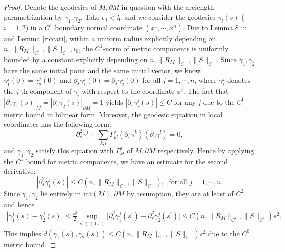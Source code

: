 \documentclass[11pt,letterpaper]{amsart}
\numberwithin{equation}{section}
\theoremstyle{definition}
\theoremstyle{plain}
\theoremstyle{definition}
\theoremstyle{plain}
\theoremstyle{definition}
\theoremstyle{plain}
\begin{document}
\begin{proof}
Denote the geodesics of $M,\partial M$ in question with the arclength parametrization by $\gamma_1,\gamma_2$. Take $\epsilon_0<i_0$ and we consider the geodesics $\gamma_i(s)$ ($i=1,2$) in a $C^1$ boundary normal coordinate $(x^1,\cdots,x^n)$. Due to Lemma 8 in \cite{HV} and Lemma \ref{riccati}, within a uniform radius explicitly depending on $n,\|R_M\|_{C^1},\|S\|_{C^1},i_0$, the $C^1$-norm of metric components is uniformly bounded by a constant explicitly depending on $n,\|R_M\|_{C^1},\|S\|_{C^1}$. Since $\gamma_1,\gamma_2$ have the same initial point and the same initial vector, we know $\gamma_1^j(0)=\gamma_2^j(0)$ and $\partial_s \gamma_1^j(0)=\partial_s \gamma_2^j(0)$ for all $j=1,\cdots,n$, where $\gamma_i^j$ denotes the $j$-th component of $\gamma_i$ with respect to the coordinate $x^j$. The fact that $|\partial_s \gamma_1(s)|_{M}=|\partial_s \gamma_2(s)|_{\partial M}=1$ yields $|\partial_s \gamma_i^j(s)|\leqslant C$ for any $j$ due to the $C^0$ metric bound in bilinear form. Moreover, the geodesic equation in local coordinates has the following form:
$$\partial_s^2 \gamma^j+\sum_{k,l}\Gamma_{kl}^j (\partial_s \gamma^k)( \partial_s \gamma^l)=0,$$
and $\gamma_1,\gamma_2$ satisfy this equation with $\Gamma_{kl}^j$ of $M,\partial M$ respectively. Hence by applying the $C^1$ bound for metric components, we have an estimate for the second derivative:
\begin{equation}\label{acceleration}
|\partial_s^2 \gamma_i^j(s)| \leqslant C(n,\|R_M\|_{C^1},\|S\|_{C^1}), \; \textrm{ for all }j=1,\cdots,n.
\end{equation}
Since $\gamma_1,\gamma_2$ lie entirely in $\textrm{int}(M),\partial M$ by assumption, they are at least of $C^2$ and hence
\begin{eqnarray*}
|\gamma_1^j(s)-\gamma_2^j(s)|\leqslant\frac{s^2}{2}\sup_{s^{\prime}\in (0,s)} \big|\partial_s^2 \gamma_1^j(s^{\prime})-\partial_s^2 \gamma_2^j(s^{\prime}) \big| \leqslant C(n,\|R_M\|_{C^1},\|S\|_{C^1})s^2.
\end{eqnarray*}
This implies $d(\gamma_1(s),\gamma_2(s))\leqslant C(n,\|R_M\|_{C^1},\|S\|_{C^1})s^2$ due to the $C^0$ metric bound.
\end{proof}
\end{document}
